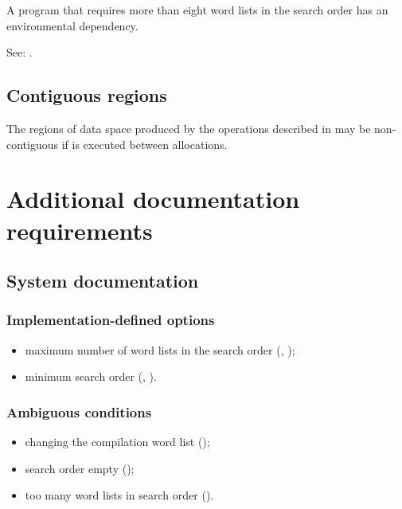 A program that requires more than eight word lists in the search
order has an environmental dependency.

See: .


\subsection{Contiguous regions} %

The regions of data space produced by the operations described in
 may be
non-contiguous if  is executed between allocations.

\section{Additional documentation requirements} %

\subsection{System documentation} %

\subsubsection{Implementation-defined options} %

\begin{itemize}
\item maximum number of word lists in the search order
	(,
	 );
\item minimum search order
	(,
	 ).
\end{itemize}

\subsubsection{Ambiguous conditions} %

\begin{itemize}
\item changing the compilation word list
	();
\item search order empty
	();
\item too many word lists in search order
	().
\end{itemize}

